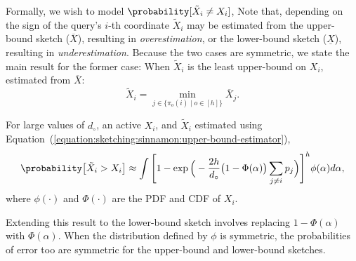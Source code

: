 Formally, we wish to model $\probability[\tilde{X}_i \neq X_i]$,
Note that, depending on the sign of the query's $i$-th coordinate
$\tilde{X}_i$ may be estimated from the upper-bound sketch ($\overline{X}$),
resulting in \emph{overestimation},
or the lower-bound sketch ($\underline{X}$), resulting in \emph{underestimation}.
Because the two cases are symmetric, we state the main result for the former case:
When $\tilde{X}_i$ is the least upper-bound on $X_i$, estimated from $\overline{X}$:
\begin{equation}
    \label{equation:sketching:sinnamon:upper-bound-estimator}
    \tilde{X}_i = \min_{j \in \{ \pi_o(i) \;|\; o \in [h] \}} \overline{X}_j.
\end{equation}

\begin{theorem}
    \label{theorem:sketching:sinnamon:sketching-error}
    For large values of $d_\circ$, an active $X_i$, and $\tilde{X}_i$ estimated 
    using Equation~(\ref{equation:sketching:sinnamon:upper-bound-estimator}),
    \begin{equation*}
        \probability\big[ \tilde{X}_i > X_i \big] \approx \int {\Bigg[ 1 - \exp\Big(-\frac{2h}{d_\circ} \big(1 - \Phi(\alpha)\big) \sum_{j \neq i} p_j \Big) \Bigg]^h \phi(\alpha) d\alpha },
    \end{equation*}
    where $\phi(\cdot)$ and $\Phi(\cdot)$ are the PDF and CDF of $X_i$.
\end{theorem}

Extending this result to the lower-bound sketch involves replacing $1 - \Phi(\alpha)$ with $\Phi(\alpha)$.
When the distribution defined by $\phi$ is symmetric, the probabilities of error
too are symmetric for the upper-bound and lower-bound sketches.

